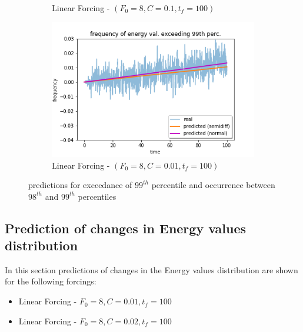 \documentclass{article}
\begin{document}
\begin{figure}[!ht]
\begin{subfigure}[b]{0.48\textwidth}
		\caption{Linear Forcing - $(F_0=8, C=0.1, t_f=100)$}
		\label{fig:pred_energy_exceed_099q_L_01_10_comp}
	\end{subfigure}%
	\begin{subfigure}[b]{0.48\textwidth}
		\includegraphics[width=1\linewidth]{fig/pred_energy_exceed_099q_L_001_100.png}
		\caption{Linear Forcing - $(F_0=8, C=0.01, t_f=100)$}
		\label{fig:pred_energy_exceed_099q_L_001_100_comp}
	\end{subfigure}
	\caption{predictions for exceedance of $99^{th}$ percentile and occurrence between $98^{th}$ and $99^{th}$ percentiles}
	\label{fig:pred_energy_exceed_099q_L}
\end{figure}

\subsection{Prediction of changes in Energy values distribution}

In this section predictions of changes in the Energy values distribution are shown for the following forcings:

\begin{itemize}
	\item Linear Forcing - $F_0=8, C=0.01, t_f=100$
	\item Linear Forcing - $F_0=8, C=0.02, t_f=100$
\end{itemize}


\clearpage



\end{document}

